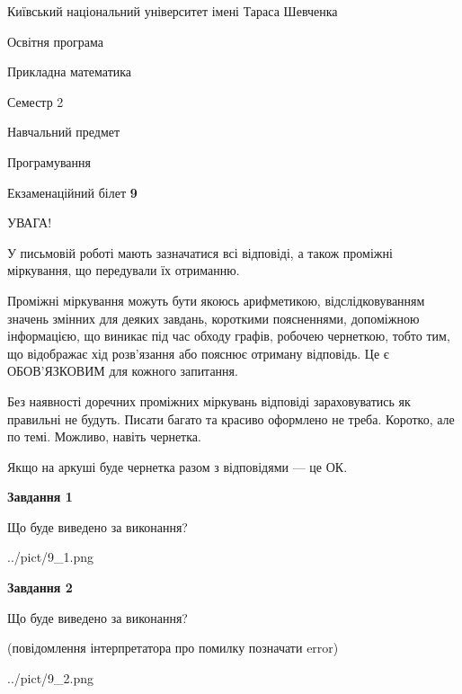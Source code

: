 \documentclass[12pt, ukrainian]{article}
\begin{document}
{{\begin {small}\par
{ \center  Київський національний університет імені Тараса Шевченка \par}
{\parbox {5 cm}{Освітня програма \hfill}{\parbox {7 cm}{Прикладна математика\hfill}}\parbox {6 cm}{\hfill Семестр 2}}\par
{\parbox {5 cm} {Навчальний предмет \hfill}\parbox {7 cm}{Програмування \hfill}\parbox {6cm}{\hfill}\par}\vspace{-7pt} \end{small}}{\center Екзаменаційний білет \No \textbf
{ 9 }\par}}
{
\begin {large}
УВАГА!

У письмовій роботі мають зазначатися всі відповіді, а також проміжні міркування, що передували їх отриманню.

Проміжні міркування можуть бути якоюсь арифметикою, відслідковуванням зна\-чень змінних для деяких завдань,
короткими поясненнями, допоміжною інформацією, що виникає під час обходу графів, робочею чернеткою,
тобто тим, що відображає хід розв’язання або пояснює отриману відповідь.
Це є ОБОВ’ЯЗКОВИМ для кожного запитання.

Без наявності доречних проміжних міркувань відповіді зараховуватись як правиль\-ні не будуть.
Писати багато та красиво оформлено не треба. Коротко, але по темі. Можли\-во, навіть чернетка.

Якщо на аркуші буде чернетка разом з відповідями --- це ОК.

\newpage

{\begin {center}\textbf{Завдання 1}\end {center}}\par
Що буде виведено за виконання?\par
\begin{center}
	{../pict/9_1.png}
\end{center}
\newpage

{\begin {center}\textbf{Завдання 2}\end {center}}\par
Що буде виведено за виконання?\par
 (повідомлення інтерпретатора про помилку позначати error)\par
\begin{center}
	{../pict/9_2.png}
\end{center}
\newpage


\end{large}}
\end{document}
